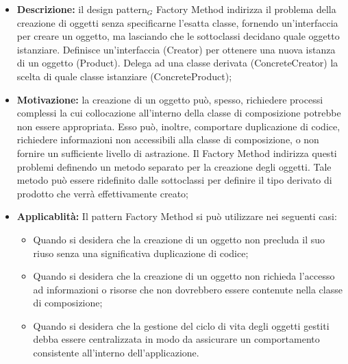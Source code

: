 \begin{itemize}
\item \textbf{Descrizione:} il design pattern$_G$ Factory Method indirizza il problema della creazione di oggetti senza specificarne l’esatta classe, fornendo un’interfaccia per creare un oggetto, ma lasciando che le sottoclassi decidano quale oggetto istanziare. Definisce un’interfaccia (Creator) per ottenere una nuova istanza di un oggetto (Product).
Delega ad una classe derivata (ConcreteCreator) la scelta di quale classe istanziare (ConcreteProduct);
\item \textbf{Motivazione:} la creazione di un oggetto può, spesso, richiedere processi complessi la cui collocazione all’interno della classe di composizione potrebbe non essere appropriata.
Esso può, inoltre, comportare duplicazione di codice, richiedere informazioni non accessibili alla classe di composizione, o non fornire un sufficiente livello di astrazione.
Il Factory Method indirizza questi problemi definendo un metodo separato per la creazione degli oggetti. Tale metodo può essere ridefinito dalle sottoclassi per definire il tipo derivato di prodotto che verrà effettivamente creato;
\item \textbf{Applicablità:} Il pattern Factory Method si può utilizzare nei seguenti casi:

\begin{itemize}
\item Quando si desidera che la creazione di un oggetto non precluda il suo riuso senza una significativa duplicazione di codice;
\item Quando si desidera che la creazione di un oggetto non richieda l’accesso ad informazioni o risorse che non dovrebbero essere contenute nella classe di composizione;
\item Quando si desidera che la gestione del ciclo di vita degli oggetti gestiti debba essere centralizzata in modo da assicurare un comportamento consistente all’interno dell’applicazione.
\end{itemize} 

\end{itemize}

\newpage